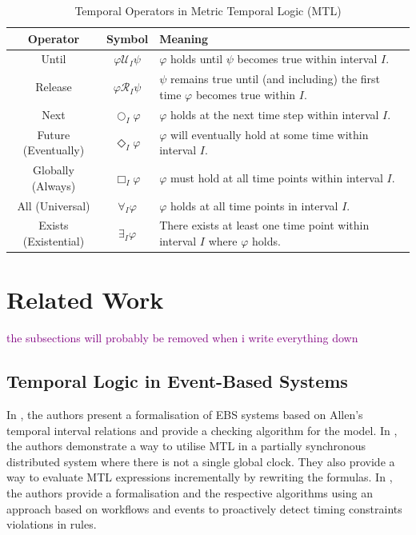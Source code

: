 \documentclass[twocolumn]{article}
\newcommand{\note}[1] {
	\textcolor{Purple}{#1}

}
\begin{document}
\begin{table}[t]
	\centering
	\renewcommand{\arraystretch}{1.5}
	\begin{tabular}{|c|c|l|}
		\hline
		\textbf{Operator}    & \textbf{Symbol}              & \textbf{Meaning}                                                                            \\
		\hline
		Until                & $\varphi \mathcal{U}_I \psi$ & $\varphi$ holds until $\psi$ becomes true within interval $I$.                              \\
		\hline
		Release              & $\varphi \mathcal{R}_I \psi$ & $\psi$ remains true until (and including) the first time $\varphi$ becomes true within $I$. \\
		\hline
		Next                 & $\bigcirc_I \varphi$         & $\varphi$ holds at the next time step within interval $I$.                                  \\
		\hline
		Future (Eventually)  & $\Diamond_I \varphi$         & $\varphi$ will eventually hold at some time within interval $I$.                            \\
		\hline
		Globally (Always)    & $\Box_I \varphi$             & $\varphi$ must hold at all time points within interval $I$.                                 \\
		\hline
		All (Universal)      & $\forall_I \varphi$          & $\varphi$ holds at all time points in interval $I$.                                         \\
		\hline
		Exists (Existential) & $\exists_I \varphi$          & There exists at least one time point within interval $I$ where $\varphi$ holds.             \\
		\hline
	\end{tabular}
	\caption{Temporal Operators in Metric Temporal Logic (MTL)}
	\label{table:mtl_operators}
\end{table}
\vfill


\section{Related Work}

\note{the subsections will probably be removed when i write everything down}
\subsection{Temporal Logic in Event-Based Systems}

In \cite{trinh_checking_2024}, the authors present a formalisation of EBS systems based on Allen's \cite{allen_maintaining_1983} temporal interval relations and provide a checking algorithm for the model.
In \cite{ganguly_distributed_2024}, the authors demonstrate a way to utilise MTL in a partially synchronous distributed system where there is not a single global clock. They also provide a way to evaluate MTL expressions incrementally by rewriting the formulas.
In \cite{mackey_early_2024}, the authors provide a formalisation and the respective algorithms using an approach based on workflows and events to proactively detect timing constraints violations in rules.
\end{document}
